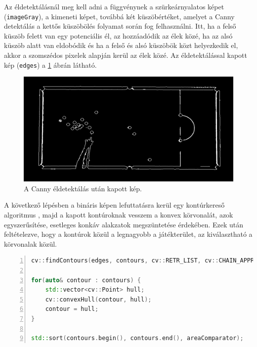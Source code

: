 \par Az éldetektálásnál meg kell adni a függvénynek a szürkeárnyalatos képet (\lstinline{imageGray}), a kimeneti képet, továbbá két küszöbértéket, amelyet a Canny detektálás a kettős küszöbölés folyamat során fog felhasználni. Itt, ha a felső küszöb felett van egy potenciális él, az hozzáadódik az élek közé, ha az alsó küszöb alatt van eldobódik és ha a felső és alsó küszöbök közt helyezkedik el, akkor a szomszédos pixelek alapján kerül az élek közé. Az éldetektálással kapott kép (\lstinline{edges}) a \ref{fig:bemeneti_kep_edge} ábrán látható.

\begin{figure}[!ht]
    \centering
    \includegraphics[width=140mm, keepaspectratio]{figures/input_screen_edge.png}
    \caption{A Canny éldetektálás után kapott kép.}
    \label{fig:bemeneti_kep_edge}
\end{figure}

\par A következő lépésben a bináris képen lefuttatásra kerül egy kontúrkereső algoritmus \cite{SUZUKI198532}, majd a kapott kontúroknak vesszem a konvex körvonalát, azok egyszerűsítése, esetleges konkáv alakzatok megszüntetése érdekében. Ezek után feltételezve, hogy a kontúrok közül a legnagyobb a játékterület, az kiválasztható a körvonalak közül.

\vspace{2mm}
\hspace{-10mm}
\begin{minipage}{\linewidth}
\begin{lstlisting}[language=C++, numbers=left, caption={Kontúrok keresése.}, label={cod:contours}]
cv::findContours(edges, contours, cv::RETR_LIST, cv::CHAIN_APPROX_SIMPLE);

for(auto& contour : contours) {
    std::vector<cv::Point> hull;
    cv::convexHull(contour, hull);
    contour = hull;
}

std::sort(contours.begin(), contours.end(), areaComparator);
\end{lstlisting}
\end{minipage}

